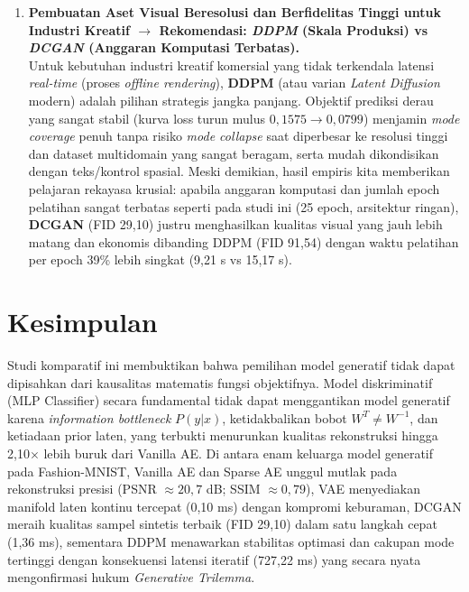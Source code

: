 \documentclass[11pt,a4paper]{article}
\begin{document}
\begin{enumerate}[leftmargin=1.4em, itemsep=3pt]
  \item \textbf{Pembuatan Aset Visual Beresolusi dan Berfidelitas Tinggi untuk Industri Kreatif $\rightarrow$ Rekomendasi: \textit{DDPM} (Skala Produksi) vs \textit{DCGAN} (Anggaran Komputasi Terbatas).}\\
  Untuk kebutuhan industri kreatif komersial yang tidak terkendala latensi \textit{real-time} (proses \textit{offline rendering}), \textbf{DDPM} (atau varian \textit{Latent Diffusion} modern) adalah pilihan strategis jangka panjang. Objektif prediksi derau yang sangat stabil (kurva loss turun mulus $0,1575 \rightarrow 0,0799$) menjamin \textit{mode coverage} penuh tanpa risiko \textit{mode collapse} saat diperbesar ke resolusi tinggi dan dataset multidomain yang sangat beragam, serta mudah dikondisikan dengan teks/kontrol spasial. Meski demikian, hasil empiris kita memberikan pelajaran rekayasa krusial: apabila anggaran komputasi dan jumlah epoch pelatihan sangat terbatas seperti pada studi ini (25 epoch, arsitektur ringan), \textbf{DCGAN} (FID 29,10) justru menghasilkan kualitas visual yang jauh lebih matang dan ekonomis dibanding DDPM (FID 91,54) dengan waktu pelatihan per epoch 39\% lebih singkat (9,21 s vs 15,17 s).
\end{enumerate}

\section{Kesimpulan}
Studi komparatif ini membuktikan bahwa pemilihan model generatif tidak dapat dipisahkan dari kausalitas matematis fungsi objektifnya. Model diskriminatif (MLP Classifier) secara fundamental tidak dapat menggantikan model generatif karena \textit{information bottleneck} $P(y|x)$, ketidakbalikan bobot $W^T \neq W^{-1}$, dan ketiadaan prior laten, yang terbukti menurunkan kualitas rekonstruksi hingga 2,10$\times$ lebih buruk dari Vanilla AE. Di antara enam keluarga model generatif pada Fashion-MNIST, Vanilla AE dan Sparse AE unggul mutlak pada rekonstruksi presisi (PSNR $\approx 20,7$ dB; SSIM $\approx 0,79$), VAE menyediakan manifold laten kontinu tercepat (0,10 ms) dengan kompromi keburaman, DCGAN meraih kualitas sampel sintetis terbaik (FID 29,10) dalam satu langkah cepat (1,36 ms), sementara DDPM menawarkan stabilitas optimasi dan cakupan mode tertinggi dengan konsekuensi latensi iteratif (727,22 ms) yang secara nyata mengonfirmasi hukum \textit{Generative Trilemma}.
\end{document}
